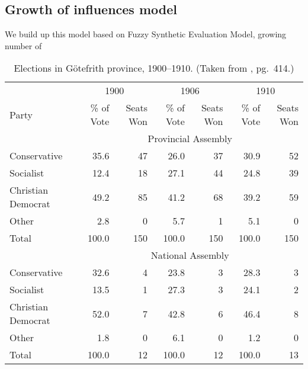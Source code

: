 \documentclass{mcmthesis}
\begin{document}
\subsection{Growth of influences model}
\qquad We build up this model based on Fuzzy Synthetic Evaluation Model, growing number of
\begin{table}[h]
\begin{center}
{\hspace{-1in}
\begin{minipage}{\textwidth}
\fontsize{10}{12}\selectfont
\begin{tabular}[c]{lrrrrrr}
\toprule
              & \multicolumn{2}{c}{1900} & \multicolumn{2}{c}{1906} & \multicolumn{2}{c}{1910}\\
\cmidrule(r){2-3}\cmidrule(lr){4-5}\cmidrule(l){6-7}
Party         & \% of Vote  & Seats Won  & \% of Vote  & Seats Won  & \% of Vote  & Seats Won \\
\midrule
\addlinespace
              & \multicolumn{6}{c}{Provincial Assembly}\\
\cmidrule{2-7}
Conservative  & 35.6        &  47        & 26.0        & 37         & 30.9        & 52\\
Socialist     & 12.4        &  18        & 27.1        & 44         & 24.8        & 39\\
Christian Democrat & 49.2   &  85        & 41.2        & 68         & 39.2        & 59\\
Other         & 2.8         &  0         & 5.7         & 1          & 5.1         & 0\\
\addlinespace
Total& 100.0       &  150       & 100.0       & 150        & 100.0       & 150\\
\addlinespace
              & \multicolumn{6}{c}{National Assembly}\\
\cmidrule{1-7}
Conservative  & 32.6        &   4        & 23.8        &  3         & 28.3        & 3\\
Socialist     & 13.5        &   1        & 27.3        &  3         & 24.1        & 2\\
Christian Democrat & 52.0   &   7        & 42.8        &  6         & 46.4        & 8\\
Other         & 1.8         &   0        & 6.1         &  0         & 1.2         & 0\\
\addlinespace
Total& 100.0       &  12        & 100.0       & 12         & 100.0       & 13\\
\bottomrule
\end{tabular}
\end{minipage}
}
\caption[Elections in G\"{o}tefrith province, 1900--1910]{Elections in
  G\"{o}tefrith province, 1900--1910.  (Taken from \cite{chicago},
  pg.~414.)}%
\label{tab:chicago-table}
\end{center}
\end{table}
\end{document}
